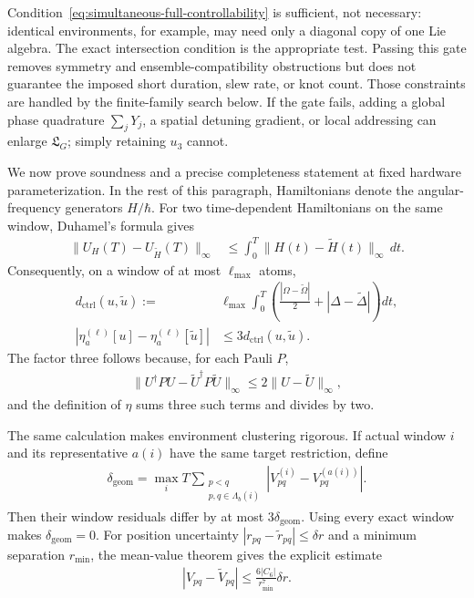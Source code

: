 Condition~\eqref{eq:simultaneous-full-controllability} is sufficient, not
necessary: identical environments, for example, may need only a diagonal
copy of one Lie algebra.  The exact intersection condition is the appropriate
test.  Passing this gate removes symmetry and ensemble-compatibility
obstructions but does not guarantee the imposed short duration, slew rate, or
knot count.  Those constraints are handled by the finite-family search below.
If the gate fails, adding a global phase quadrature
$\sum_jY_j$, a spatial detuning gradient, or local addressing can enlarge
$\mathfrak L_G$; simply retaining $u_3$ cannot.

We now prove soundness and a precise completeness statement at fixed hardware
parameterization.  In the rest of this paragraph, Hamiltonians denote the
angular-frequency generators $H/\hbar$.  For two time-dependent Hamiltonians
on the same window, Duhamel's formula gives
\begin{align}
\|U_H(T)-U_{\widetilde H}(T)\|_\infty
&\leq\int_0^T\|H(t)-\widetilde H(t)\|_\infty\,dt.
\label{eq:duhamel-control-bound}
\end{align}
Consequently, on a window of at most $\ell_{\max}$ atoms,
\begin{align}
d_{\mathrm{ctrl}}(u,\widetilde u)
:={}&\ell_{\max}\int_0^T
\left(\frac{|\Omega-\widetilde\Omega|}{2}
+|\Delta-\widetilde\Delta|\right)dt,
\nonumber\\
|\eta_a^{(\ell)}[u]-\eta_a^{(\ell)}[\widetilde u]|
&\leq3d_{\mathrm{ctrl}}(u,\widetilde u).
\label{eq:control-to-local-residual-lipschitz}
\end{align}
The factor three follows because, for each Pauli $P$,
\begin{align}
\|U^\dagger PU-\widetilde U^\dagger P\widetilde U\|_\infty
\leq2\|U-\widetilde U\|_\infty,
\end{align}
and the definition of $\eta$ sums three such terms and divides by two.

The same calculation makes environment clustering rigorous.  If actual
window $i$ and its representative $a(i)$ have the same target restriction,
define
\begin{align}
\delta_{\mathrm{geom}}
=\max_i T\sum_{\substack{p<q\\p,q\in\Lambda_b(i)}}
\left|V_{pq}^{(i)}-V_{pq}^{(a(i))}\right|.
\label{eq:configuration-cluster-radius}
\end{align}
Then their window residuals differ by at most
$3\delta_{\mathrm{geom}}$.  Using every exact window makes
$\delta_{\mathrm{geom}}=0$.  For position uncertainty
$|r_{pq}-\widetilde r_{pq}|\leq\delta r$ and a minimum separation
$r_{\min}$, the mean-value theorem gives the explicit estimate
\begin{align}
|V_{pq}-\widetilde V_{pq}|
\leq\frac{6|C_6|}{r_{\min}^7}\delta r.
\label{eq:rydberg-position-lipschitz}
\end{align}

